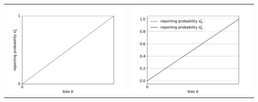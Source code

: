 \documentclass{article}
\begin{document}
\begin{tabular}{cc}
	\includegraphics[scale=.5]{bias_reporting_probability} & \includegraphics[scale=.5]{bias_reporting_probability_reporting_probability} \\

\end{tabular}
\end{document}
